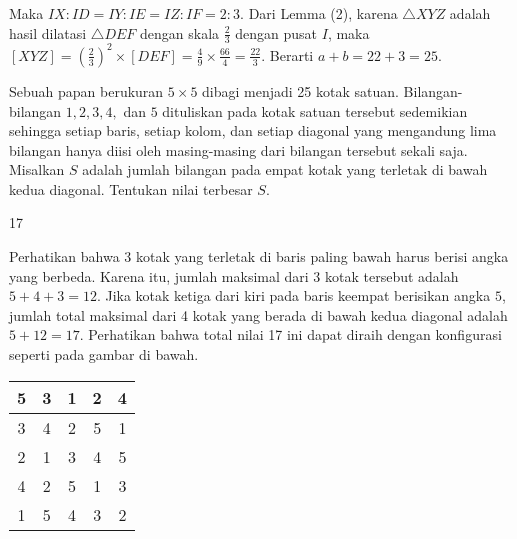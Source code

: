 \documentclass[11pt]{scrartcl}
\begin{document}
\begin{soaljawab}
\begin{solusi}
		Maka $IX:ID=IY:IE=IZ:IF=2:3$. Dari Lemma (2), karena $\triangle XYZ$ adalah hasil dilatasi $\triangle DEF$ dengan skala $\frac{2}{3}$ dengan pusat $I$, maka $[XYZ]=\left (\frac{2}{3}\right)^2\times [DEF]=\frac{4}{9}\times\frac{66}{4}=\frac{22}{3}.$ Berarti $a+b=22+3=25$.
		
		\end{solusi}
	\end{soaljawab}
	
	\begin{soaljawab}
		Sebuah papan berukuran $5 \times 5$ dibagi menjadi 25 kotak satuan. Bilangan-bilangan $1,2,3,4,$ dan $5$ dituliskan pada kotak satuan tersebut sedemikian sehingga setiap baris, setiap kolom, dan setiap diagonal yang mengandung lima bilangan hanya diisi oleh masing-masing dari bilangan tersebut sekali saja. Misalkan $S$ adalah jumlah bilangan pada empat kotak yang terletak di bawah kedua diagonal. Tentukan nilai terbesar $S$.
		
		\begin{jawaban}
		17
		\end{jawaban}
		\begin{solusi}
		Perhatikan bahwa 3 kotak yang terletak di baris paling bawah harus berisi angka yang berbeda. Karena itu, jumlah maksimal dari 3 kotak tersebut adalah $5+4+3=12$. Jika kotak ketiga dari kiri pada baris keempat berisikan angka $5$, jumlah total maksimal dari 4 kotak yang berada di bawah kedua diagonal adalah $5+12=17$. Perhatikan bahwa total nilai 17 ini dapat diraih dengan konfigurasi seperti pada gambar di bawah.
		\begin{center} 
		\begin{tabular}{ |c|c|c|c|c| }
			\hline
			5 & 3 & 1 & 2 & 4 \\
			\hline
			3 & 4 & 2 & 5 & 1 \\
			\hline
			2 & 1 & 3 & 4 & 5 \\
			\hline
			4 & 2 & \cellcolor{green!30}5 & 1 & 3 \\
			\hline
			1 &\cellcolor{green!30}5 &\cellcolor{green!30}4 &\cellcolor{green!30}3 & 2 \\
			\hline
		\end{tabular}
		\end{center}
		\end{solusi}
	\end{soaljawab}
		
\end{document}
